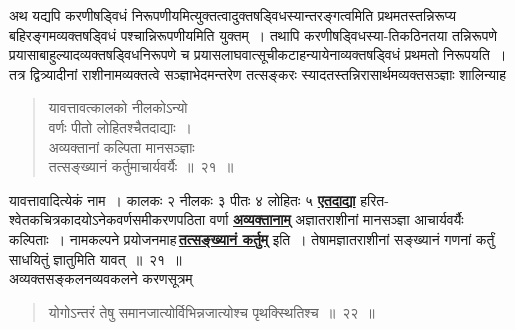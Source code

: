 \documentclass[11pt, openany]{book}
\begin{document}
अथ यद्यपि करणीषड्विधं
निरूपणीयमित्युक्तत्वादुक्तषड्विधस्यान्तरङ्गत्वमिति प्रथमतस्तन्निरूप्य बहिरङ्गमव्यक्तषड्विधं पश्चान्निरूपणीयमिति युक्तम्~।
तथापि करणीषड्विधस्या-तिकठिनतया तन्निरूपणे प्रयासाबाहुल्यादव्यक्तषड्विधनिरूपणे
च प्रयासलाघवात्सूचीकटाहन्यायेनाव्यक्तषड्विधं प्रथमतो निरूपयति~। तत्र
द्वित्र्यादीनां राशीनामव्यक्तत्वे सञ्ज्ञाभेदमन्तरेण तत्सङ्करः
स्यादतस्तन्निरासार्थमव्यक्तसञ्ज्ञाः शालिन्याह\textendash 

 \label{21}
\begin{quote}
    \ab
    यावत्तावत्कालको नीलकोऽन्यो \\

\vspace{-6mm}
\hspace{0.6cm}वर्णः पीतो लोहितश्चैतदाद्याः~। \\

\vspace{-6mm}
अव्यक्तानां कल्पिता मानसञ्ज्ञाः  \\

\vspace{-6mm}
\hspace{0.6cm}तत्सङ्ख्यानं कर्तुमाचार्यवर्यैः~॥~२१~॥
\end{quote}

यावत्तावादित्येकं नाम~। कालकः २ नीलकः ३ पीतः ४ लोहितः ५
\hyperref[21]{\textbf{एतदाद्या}} हरित-श्वेतकचित्रकादयोऽनेकवर्णसमीकरणपठिता वर्णा \hyperref[21]{\textbf{अव्यक्तानाम्}} अज्ञातराशीनां मानसञ्ज्ञा आचार्यवर्यैः कल्पिताः~।
नामकल्पने प्रयोजनमाह\textendash \,\hyperref[21]{\textbf{तत्सङ्ख्यानं कर्तुम्}} इति~। तेषामज्ञातराशीनां सङ्ख्यानं गणनां कर्तुं साधयितुं ज्ञातुमिति यावत्~॥~२१~॥\\

\vspace{-2mm}
{\bqt अव्यक्तसङ्कलनव्यवकलने करणसूत्रम्\textendash \,}

 \label{22}
\begin{quote}
    \ab
    योगोऽन्तरं तेषु समानजात्योर्विभिन्नजात्योश्च पृथक्स्थितिश्च~॥~२२~॥
\end{quote}
\end{document}
